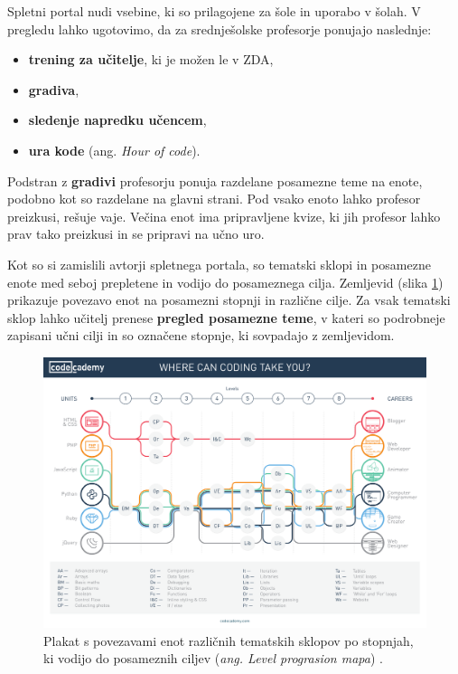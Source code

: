 Spletni portal nudi vsebine, ki so prilagojene za šole in uporabo v
šolah. V pregledu lahko ugotovimo, da za srednješolske profesorje
ponujajo naslednje:

\begin{itemize}
\item \textbf{trening za učitelje}, ki je možen le v ZDA,
\item \textbf{gradiva},
\item \textbf{sledenje napredku učencem},
\item \textbf{ura kode} (ang. \emph{Hour of code}).
\end{itemize}

Podstran z \textbf{ gradivi} %
profesorju ponuja razdelane posamezne teme na enote, podobno kot so
razdelane na glavni strani. Pod vsako enoto lahko profesor preizkusi,
rešuje vaje. Večina enot ima pripravljene kvize, ki jih profesor lahko
prav tako preizkusi in se pripravi na učno uro.


Kot so si zamislili avtorji spletnega portala, so tematski sklopi in
posamezne enote med seboj prepletene in vodijo do posameznega
cilja. Zemljevid (slika \ref{fig:codeacademy:poster}) prikazuje
povezavo enot na posamezni stopnji in različne cilje. Za vsak tematski
sklop lahko učitelj prenese \textbf{pregled posamezne teme}, v kateri
so podrobneje zapisani učni cilji in so označene stopnje, ki sovpadajo
z zemljevidom.

\begin{figure}[h!]
  \centering
    \includegraphics [width=1\linewidth, keepaspectratio =
   1] {./images/CAdemy-poster.pdf}
   \caption{Plakat s povezavami enot različnih tematskih sklopov po
     stopnjah, ki vodijo  do posameznih ciljev (\emph{ang. Level
       prograsion mapa}) \cite{web:codeacademy}.}
    \label{fig:codeacademy:poster}
\end{figure}

